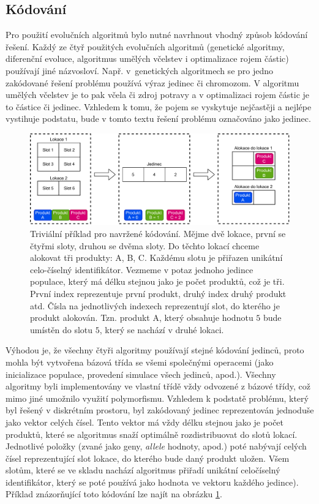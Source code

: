 \subsection{Kódování}
Pro použití evolučních algoritmů bylo nutné navrhnout vhodný způsob kódování řešení. Každý ze čtyř použitých evolučních algoritmů (genetické algoritmy, diferenční evoluce, algoritmus umělých včelstev i optimalizace rojem částic) používají jiné názvosloví. Např. v~genetických algoritmech se pro jedno zakódované řešení problému používá výraz jedinec či chromozom. V algoritmu umělých včelstev je to pak včela či zdroj potravy a v optimalizaci rojem částic je to částice či jedinec. Vzhledem k tomu, že pojem  se vyskytuje nejčastěji a nejlépe vystihuje podstatu, bude v tomto textu řešení problému označováno jako jedinec.

\begin{figure}[t]
    \centering
    \includegraphics[width=0.99\linewidth]{figures/implementace/ChromosomeEncoding.pdf}
    \caption{Triviální příklad pro navržené kódování. Mějme dvě lokace, první se čtyřmi sloty, druhou se dvěma sloty. Do těchto lokací chceme alokovat tři produkty: A, B, C. Každému slotu je přiřazen unikátní celo-číselný identifikátor. Vezmeme v potaz jednoho jedince populace, který má délku stejnou jako je počet produktů, což je tři. První index reprezentuje první produkt, druhý index druhý produkt atd. Čísla na jednotlivých indexech reprezentují slot, do kterého je produkt alokován. Tzn. produkt A, který obsahuje hodnotu $5$ bude umístěn do slotu $5$, který se nachází v druhé lokaci.}
    \label{fig:chromosomeEncoding}
\end{figure}

Výhodou je, že všechny čtyři algoritmy používají stejné kódování jedinců, proto mohla být vytvořena bázová třída se všemi společnými operacemi (jako inicializace populace, provedení simulace všech jedinců, apod.). Všechny algoritmy byli implementovány ve vlastní třídě vždy odvozené z bázové třídy, což mimo jiné umožnilo využití polymorfismu. Vzhledem k podstatě problému, který byl řešený v diskrétním prostoru, byl zakódovaný jedinec reprezentován jednoduše jako vektor celých čísel. Tento vektor má vždy délku stejnou jako je počet produktů, které se algoritmus snaží optimálně rozdistribuovat do slotů lokací. Jednotlivé položky (zvané jako geny, \emph{allele} hodnoty, apod.) poté nabývají celých čísel reprezentující slot lokace, do kterého bude daný produkt uložen. Všem slotům, které se ve skladu nachází algoritmus přiřadí unikátní celočíselný identifikátor, který se poté používá jako hodnota ve vektoru každého jedince). Příklad znázorňující toto kódování lze najít na obrázku \ref{fig:chromosomeEncoding}.

